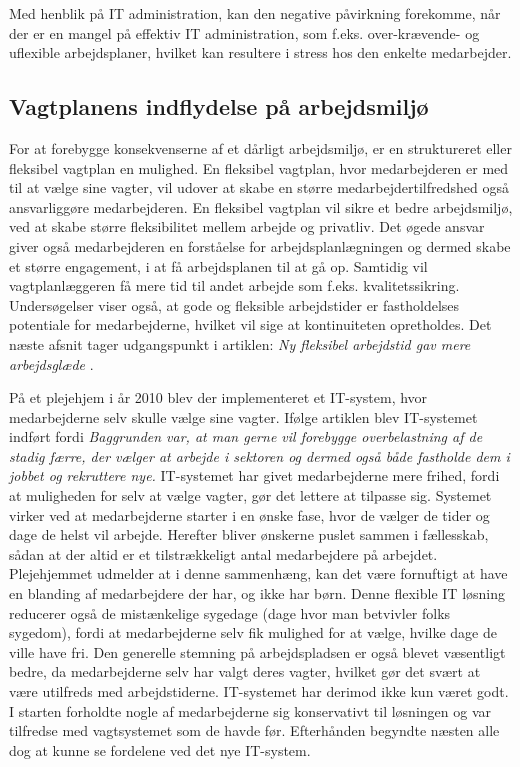 Med henblik på IT administration, kan den negative påvirkning forekomme, når der er en mangel på effektiv IT administration, som f.eks. over-krævende- og uflexible arbejdsplaner, hvilket kan resultere i stress hos den enkelte medarbejder\citep{Cambridge2011}.

\subsection{Vagtplanens indflydelse på arbejdsmiljø}
For at forebygge konsekvenserne af et dårligt arbejdsmiljø, er en struktureret eller fleksibel vagtplan en mulighed. En fleksibel vagtplan, hvor medarbejderen er med til at vælge sine vagter, vil udover at skabe en større medarbejdertilfredshed også ansvarliggøre medarbejderen. En fleksibel vagtplan vil sikre et bedre arbejdsmiljø, ved at skabe større fleksibilitet mellem arbejde og privatliv. Det øgede ansvar giver også medarbejderen en forståelse for arbejdsplanlægningen og dermed skabe et større engagement, i at få arbejdsplanen til at gå op. Samtidig vil vagtplanlæggeren få mere tid til andet arbejde som f.eks. kvalitetssikring.
Undersøgelser viser også, at gode og fleksible arbejdstider er fastholdelses potentiale for medarbejderne, hvilket vil sige at kontinuiteten opretholdes. 
Det næste afsnit tager udgangspunkt i artiklen: \textit{Ny fleksibel arbejdstid gav mere arbejdsglæde}
\citep{Thomse2014}.

På et plejehjem i år 2010 blev der implementeret et IT-system, hvor medarbejderne selv skulle vælge sine vagter. Ifølge artiklen blev IT-systemet indført fordi \textit{Baggrunden var, at man gerne vil forebygge overbelastning af de stadig færre, der vælger at arbejde i sektoren og dermed også både fastholde dem i jobbet og rekruttere nye.} IT-systemet har givet medarbejderne mere frihed, fordi at muligheden for selv at vælge vagter, gør det lettere at tilpasse sig. Systemet virker ved at medarbejderne starter i en ønske fase, hvor de vælger de tider og dage de helst vil arbejde. Herefter bliver ønskerne puslet sammen i fællesskab, sådan at der altid er et tilstrækkeligt antal medarbejdere på arbejdet. Plejehjemmet udmelder at i denne sammenhæng, kan det være fornuftigt at have en blanding af medarbejdere der har, og ikke har børn. Denne flexible IT løsning reducerer også de mistænkelige sygedage (dage hvor man betvivler folks sygedom), fordi at medarbejderne selv fik mulighed for at vælge, hvilke dage de ville have fri. Den generelle stemning på arbejdspladsen er også blevet væsentligt bedre, da medarbejderne selv har valgt deres vagter, hvilket gør det svært at være utilfreds med arbejdstiderne. IT-systemet har derimod ikke kun været godt. I starten forholdte nogle af medarbejderne sig konservativt til løsningen og var tilfredse med vagtsystemet som de havde før. Efterhånden begyndte næsten alle dog at kunne se fordelene ved det nye IT-system. 

